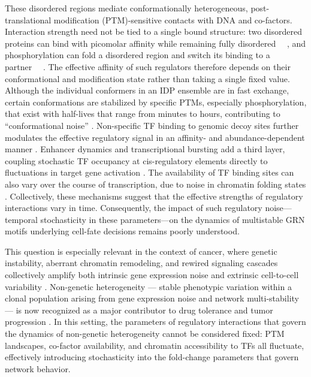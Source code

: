 \documentclass[11pt]{article}
\providecommand{\DIFaddtex}[1]{{\protect\color{red}#1}} %
\providecommand{\DIFdeltex}[1]{} %
\providecommand{\DIFaddbegin}{} %
\providecommand{\DIFaddend}{} %
\providecommand{\DIFdelbegin}{} %
\providecommand{\DIFdelend}{} %
\providecommand{\DIFadd}[1]{\texorpdfstring{\DIFaddtex{#1}}{#1}} %
\providecommand{\DIFdel}[1]{\texorpdfstring{\DIFdeltex{#1}}{}} %
\providecommand{\DIFaddincludegraphics}[2][]{\DIFOincludegraphics[#1]{#2}} %
\providecommand{\DIFdelincludegraphics}[2][]{}
\DeclareRobustCommand{\DIFaddbegin}{\DIFOaddbegin \let\includegraphics\DIFaddincludegraphics} %
\DeclareRobustCommand{\DIFaddend}{\DIFOaddend \let\includegraphics\DIFOincludegraphics} %
\DeclareRobustCommand{\DIFdelbegin}{\DIFOdelbegin \let\includegraphics\DIFdelincludegraphics} %
\DeclareRobustCommand{\DIFdelend}{\DIFOaddend \let\includegraphics\DIFOincludegraphics} %
\begin{document}
These disordered regions mediate conformationally heterogeneous, post-translational modification (PTM)-sensitive contacts with DNA and co-factors\DIFdelbegin \DIFdel{, causing regulatory affinities to vary dynamically rather than assume a }\DIFdelend \DIFaddbegin \DIFadd{. Interaction strength need not be tied to a single bound structure: two disordered proteins can bind with picomolar affinity while remaining fully disordered~\mbox{%
\cite{Borgia2018Extreme}}\hskip0pt%
, and phosphorylation can fold a disordered region and switch its binding to a partner~\mbox{%
\cite{Bah2015Folding}}\hskip0pt%
. The effective affinity of such regulators therefore depends on their conformational and modification state rather than taking a single }\DIFaddend fixed value. \DIFdelbegin \DIFdel{Therefore, understanding IDP conformational noise is paramount for understanding cell-fate specification. }\DIFdelend Although the individual conformers in an IDP ensemble are in fast exchange, certain conformations are stabilized by specific PTMs, especially phosphorylation, that exist with half-lives that range from minutes to hours, contributing to ``conformational noise'' \cite{Kulkarni2022, Kulkarni2019}. Non-specific TF binding to genomic decoy sites further modulates the effective regulatory signal in an affinity- and abundance-dependent manner \cite{Dey2020EnhancementSites, Burger2012InfluenceExpression}. Enhancer dynamics and transcriptional bursting add a third layer, coupling stochastic TF occupancy at cis-regulatory elements directly to fluctuations in target gene activation \cite{Raj2006StochasticCells, Fukaya2016EnhancerBursting}. The availability of TF binding sites can also vary over the course of transcription, due to noise in chromatin folding states \cite{Gamble2025}. Collectively, these mechanisms \DIFdelbegin \DIFdel{argue that the parameters governing regulatory interactions are not static; instead, they are stochastic quantities}\DIFdelend \DIFaddbegin \DIFadd{suggest that the effective strengths of regulatory interactions vary in time}\DIFaddend . Consequently, the impact of such regulatory noise—temporal stochasticity in these parameters—on the dynamics of multistable GRN motifs underlying cell-fate decisions remains poorly understood.


This question is especially relevant in the context of cancer, where genetic instability, aberrant chromatin remodeling, and rewired signaling cascades collectively amplify both intrinsic gene expression noise and extrinsic cell-to-cell variability \cite{Brock2009Non-geneticTumours, Landau2014LocallyLeukemia, Hanahan2026HallmarksBeyond}. Non-genetic heterogeneity — stable phenotypic variation within a clonal population arising from gene expression noise and network multi-stability — is now recognized as a major contributor to drug tolerance and tumor progression \cite{Hanahan2026HallmarksBeyond, Franca2024CellularContinuum, Shaffer2017RareResistance}. In this setting, the parameters of regulatory interactions that govern the dynamics of non-genetic heterogeneity cannot be considered fixed: PTM landscapes, co-factor availability, and chromatin accessibility to TFs all fluctuate, effectively introducing stochasticity into the fold-change parameters that govern network behavior. 
\end{document}
